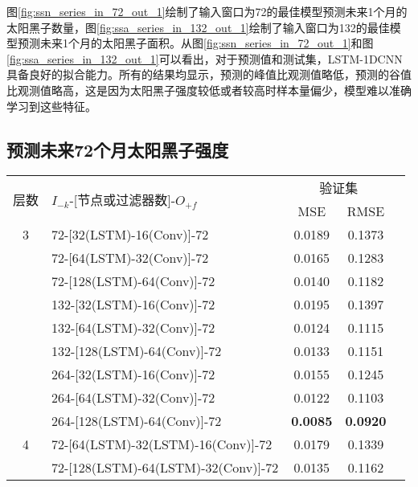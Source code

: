 图\ref{fig:ssn_series_in_72_out_1}绘制了输入窗口为72的最佳模型预测未来1个月的太阳黑子数量，图\ref{fig:ssa_series_in_132_out_1}绘制了输入窗口为132的最佳模型预测未来1个月的太阳黑子面积。从图\ref{fig:ssn_series_in_72_out_1}和图\ref{fig:ssa_series_in_132_out_1}可以看出，对于预测值和测试集，LSTM-1DCNN具备良好的拟合能力。所有的结果均显示，预测的峰值比观测值略低，预测的谷值比观测值略高，这是因为太阳黑子强度较低或者较高时样本量偏少，模型难以准确学习到这些特征。

\subsection{预测未来72个月太阳黑子强度}\label{sec:ss_result_72}

\begin{table}[!htbp]
  \centering
  \label{tab:ss_number_out_72}
  \footnotesize
  \renewcommand{\arraystretch}{1}
  \begin{tabular}{clccc}
    \toprule
    \multirow{2}{*}{层数} & \multirow{2}{*}{$I_{-k}$-[节点或过滤器数]-$O_{+f}$} & \multicolumn{2}{c}{验证集}\\
    \cmidrule(lr){3-4}
    \noalign{\smallskip}
    & & MSE & RMSE\\
    \midrule 
    3 & 72-[32(LSTM)-16(Conv)]-72 & 0.0189 & 0.1373 \\ 
      & 72-[64(LSTM)-32(Conv)]-72 & 0.0165 & 0.1283 \\
      & 72-[128(LSTM)-64(Conv)]-72 & 0.0140 & 0.1182 \\
      & 132-[32(LSTM)-16(Conv)]-72 & 0.0195 & 0.1397 \\
      & 132-[64(LSTM)-32(Conv)]-72 & 0.0124 & 0.1115 \\
      & 132-[128(LSTM)-64(Conv)]-72 & 0.0133 & 0.1151 \\
      & 264-[32(LSTM)-16(Conv)]-72 & 0.0155 & 0.1245 \\
      & 264-[64(LSTM)-32(Conv)]-72 & 0.0122 & 0.1103 \\
      & 264-[128(LSTM)-64(Conv)]-72 & \textbf{0.0085} & \textbf{0.0920} \\
    \hline
    4 & 72-[64(LSTM)-32(LSTM)-16(Conv)]-72 & 0.0179 & 0.1339 \\
      & 72-[128(LSTM)-64(LSTM)-32(Conv)]-72 & 0.0135 & 0.1162  \\

\end{tabular}
\end{table}
